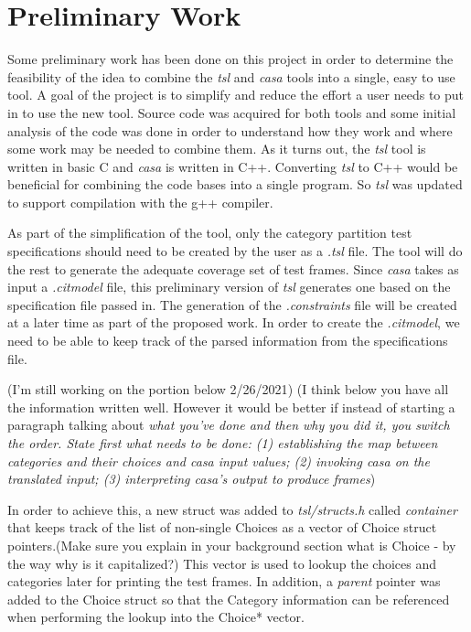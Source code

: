 \documentclass[a4full,12pt]{article}
\newcommand{\eas}[1]{{\color{blue}\sf ({#1})}}
\newcommand{\ag}[1]{{\color{red}\sf ({#1})}}
\begin{document}
\section{Preliminary Work}
Some preliminary work has been done on this project in order to determine the
  feasibility of the idea to combine the \emph{tsl} and \emph{casa} tools into 
  a single, easy to use tool. A goal of the project is to simplify and reduce the
  effort a user needs to put in to use the new tool. Source code was acquired for
  both tools and some initial analysis of the code was done in order to understand
  how they work and where some work may be needed to combine them. As it
  turns out, the \emph{tsl} tool is written in basic C and \emph{casa} is written
  in C++. Converting \emph{tsl} to C++ would be beneficial for combining the 
  code bases into a single program. So \emph{tsl} was updated to support compilation
  with the g++ compiler.

As part of the simplification of the tool, only the category partition test specifications
  should need to be created by the user as a \emph{.tsl} file. The tool will do the rest to
  generate the adequate coverage set of test frames. Since \emph{casa} takes as input a 
  \emph{.citmodel} file, this preliminary version of \emph{tsl} generates one based on the
  specification file passed in. The generation of the \emph{.constraints} file will be created
  at a later time as part of the proposed work. In order to create the \emph{.citmodel}, we need
  to be able to keep track of the parsed information from the specifications file.
  
\ag{I'm still working on the portion below 2/26/2021}    
\eas{I think below you have all the information written well. However it would be better if instead of starting a paragraph
  talking about \em{what you've done} and then \em{why you did it}, you switch the order. State first what needs to be done:
  (1) establishing the map between categories and their choices and casa input values;
  (2) invoking casa on the translated input;
  (3) interpreting casa's output to produce frames}
  
In order to achieve this, a new struct was added to \emph{tsl/structs.h} called \emph{container} that
  keeps track of the list of non-single Choices as a vector of Choice struct
  pointers.\eas{Make sure you explain in your background section what is Choice - by the way why is it capitalized?} This vector is used to lookup the choices and categories later for
  printing the test frames. In addition, a \emph{parent} pointer was added to
  the Choice struct so that the Category information can be referenced when
  performing the lookup into the Choice* vector.
  
\end{document}

